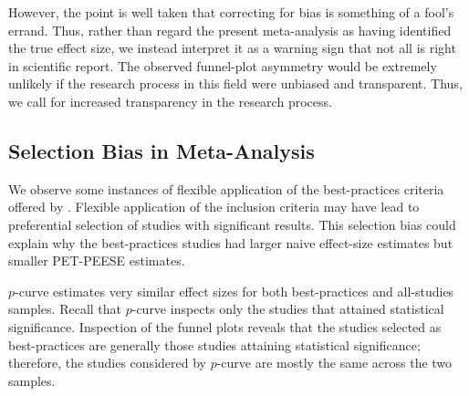 \documentclass[man]{apa6}
\begin{document}
However, the point is well taken that correcting for bias is something of a fool's errand.
Thus, rather than regard the present meta-analysis as having identified the true effect size, we instead interpret it as a warning sign that not all is right in scientific report. The observed funnel-plot asymmetry would be extremely unlikely if the research process in this field were unbiased and transparent. Thus, we call for increased transparency in the research process. 

\subsection{Selection Bias in Meta-Analysis} 
We observe some instances of flexible application of the best-practices criteria offered by \citet{Anderson:etal:2010}. Flexible application of the inclusion criteria may have lead to preferential selection of studies with significant results. This selection bias could explain why the best-practices studies had larger naive effect-size estimates but smaller PET-PEESE estimates.

$p$-curve estimates very similar effect sizes for both best-practices and all-studies samples. Recall that $p$-curve inspects only the studies that attained statistical significance. Inspection of the funnel plots reveals that the studies selected as best-practices are generally those studies attaining statistical significance; therefore, the studies considered by $p$-curve are mostly the same across the two samples.

\end{document}

